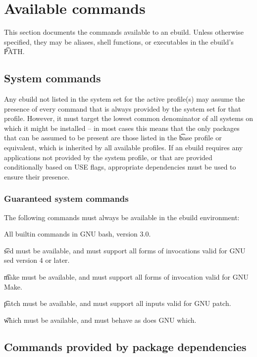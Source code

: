 \section{Available commands}
\label{ebuild-env-commands}

This section documents the commands available to an ebuild. Unless otherwise specified, they may be
aliases, shell functions, or executables in the ebuild's \t{PATH}.

\subsection{System commands}

Any ebuild not listed in the system set for the active profile(s) may assume the presence of every
command that is always provided by the system set for that profile. However, it must target the
lowest common denominator of all systems on which it might be installed -- in most cases this means
that the only packages that can be assumed to be present are those listed in the \t{base} profile or
equivalent, which is inherited by all available profiles. If an ebuild requires any applications not
provided by the system profile, or that are provided conditionally based on USE flags, appropriate
dependencies must be used to ensure their presence.

\subsubsection{Guaranteed system commands}

The following commands must always be available in the ebuild environment:
\begin{bulletlist}
\item All builtin commands in GNU bash, version 3.0.
\item \t{sed} must be available, and must support all forms of invocations valid for GNU sed
    version 4 or later.
\item \t{make} must be available, and must support all forms of invocation valid for GNU Make.
\item \t{patch} must be available, and must support all inputs valid for GNU patch.
\item \t{which} must be available, and must behave as does GNU which.
\end{bulletlist}

\subsection{Commands provided by package dependencies}

